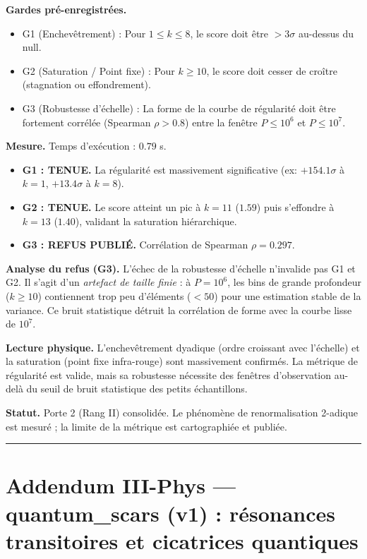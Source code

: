 \documentclass[11pt,a4paper]{article}
\begin{document}
\textbf{Gardes pré-enregistrées.}
\begin{itemize}
\item G1 (Enchevêtrement) : Pour $1 \le k \le 8$, le score doit être $> 3\sigma$ au-dessus du null.
\item G2 (Saturation / Point fixe) : Pour $k \ge 10$, le score doit cesser de croître (stagnation ou effondrement).
\item G3 (Robustesse d'échelle) : La forme de la courbe de régularité doit être fortement corrélée (Spearman $\rho > 0.8$) entre la fenêtre $P \le 10^6$ et $P \le 10^7$.
\end{itemize}

\textbf{Mesure.} Temps d'exécution : $0.79$ s.
\begin{itemize}
\item \textbf{G1 : TENUE.} La régularité est massivement significative (ex: $+154.1\sigma$ à $k=1$, $+13.4\sigma$ à $k=8$).
\item \textbf{G2 : TENUE.} Le score atteint un pic à $k=11$ ($1.59$) puis s'effondre à $k=13$ ($1.40$), validant la saturation hiérarchique.
\item \textbf{G3 : REFUS PUBLIÉ.} Corrélation de Spearman $\rho = 0.297$.
\end{itemize}

\textbf{Analyse du refus (G3).} L'échec de la robustesse d'échelle n'invalide pas G1 et G2. Il s'agit d'un \textit{artefact de taille finie} : à $P = 10^6$, les bins de grande profondeur ($k \ge 10$) contiennent trop peu d'éléments ($< 50$) pour une estimation stable de la variance. Ce bruit statistique détruit la corrélation de forme avec la courbe lisse de $10^7$. 

\textbf{Lecture physique.} L'enchevêtrement dyadique (ordre croissant avec l'échelle) et la saturation (point fixe infra-rouge) sont massivement confirmés. La métrique de régularité est valide, mais sa robustesse nécessite des fenêtres d'observation au-delà du seuil de bruit statistique des petits échantillons.

\textbf{Statut.} Porte 2 (Rang II) consolidée. Le phénomène de renormalisation 2-adique est mesuré ; la limite de la métrique est cartographiée et publiée.

\vspace{1cm}
\hrule
\vspace{1cm}

\section*{Addendum III-Phys --- quantum\_scars (v1) : résonances transitoires et cicatrices quantiques}
\end{document}
